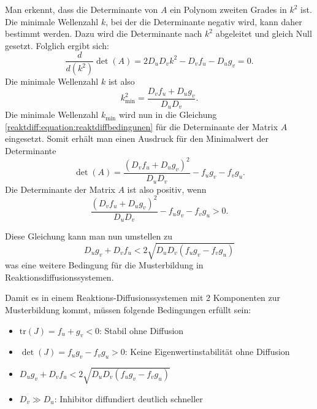 Man erkennt, dass die Determinante von \(A\) ein Polynom zweiten Grades in \(k^2\) ist.  
Die minimale Wellenzahl \(k\), bei der die Determinante negativ wird, kann daher bestimmt werden.  
Dazu wird die Determinante nach \(k^2\) abgeleitet und gleich Null gesetzt.  
Folglich ergibt sich:
\begin{equation*}
    \frac{d}{d \left(k^2\right)} \det(A) = 2 D_u D_v k^2 - D_v f_u - D_u g_v = 0.
\end{equation*}
Die minimale Wellenzahl \(k\) ist also
\begin{equation*}
    k^2_{\text{min}} = \frac{D_v f_u + D_u g_v}{D_u D_v}.
\end{equation*}
Die minimale Wellenzahl \(k_{\text{min}}\) wird nun in die Gleichung \eqref{reaktdiff:equation:reaktdiffbedingunen} für die Determinante der Matrix \(A\) eingesetzt.
Somit erhält man einen Ausdruck für den Minimalwert der Determinante
\begin{equation*}
    \det(A) = \frac{(D_v f_u + D_u g_v)^2}{D_u D_v} - f_u g_v - f_v g_u.
\end{equation*}
Die Determinante der Matrix \(A\) ist also positiv, wenn
\begin{equation*}
    \frac{(D_v f_u + D_u g_v)^2}{D_u D_v} - f_u g_v - f_v g_u > 0.
\end{equation*}

Diese Gleichung kann man nun umstellen zu
\begin{equation*}
    D_u g_v+D_v f_u < 2\sqrt{D_u D_v(f_u g_v - f_v g_u)}
\end{equation*}
was eine weitere Bedingung für die Musterbildung in Reaktionsdiffusionssystemen.

\begin{satz}
\label{reaktdiff:satz:bedingungen}
Damit es in einem Reaktions-Diffusionssystemen mit 2 Komponenten zur Musterbildung kommt, müssen folgende Bedingungen erfüllt sein:
\begin{itemize}
    \item \(\text{tr}(J) = f_u + g_v < 0\): Stabil ohne Diffusion
    \item \(\det(J) = f_u g_v - f_v g_u > 0\): Keine Eigenwertinstabilität ohne Diffusion
    \item \(D_u g_v + D_v f_u < 2\sqrt{D_u D_v (f_u g_v - f_v g_u)}\)
    \item \(D_v \gg D_u\): Inhibitor diffundiert deutlich schneller
\end{itemize}
\end{satz}


